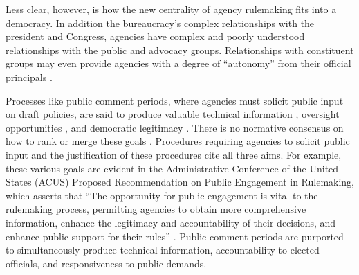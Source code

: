 Less clear, however, is how the new centrality of agency rulemaking fits into a democracy. In addition the bureaucracy's complex relationships with the president and Congress, agencies have complex and poorly understood relationships with the public and advocacy groups. Relationships with constituent groups may even provide agencies with a degree of ``autonomy'' from their official principals \citep{Carpenter2001}. %

Processes like public comment periods, where agencies must solicit public input on draft policies, are said to produce valuable technical information \citep{Yackee2006JPART, Nelson2012}, oversight opportunities \citep{Balla1998, Mccubbins1984}, and democratic legitimacy \citep{Croley2003, Rosenbloom2003}. There is no normative consensus on how to rank or merge these goals \citep{Wilson1967, Wilson1989, Carrigan2017}. Procedures requiring agencies to solicit public input and the justification of these procedures cite all three aims. For example, these various goals are evident in the Administrative Conference of the United States (ACUS) Proposed Recommendation on Public Engagement in Rulemaking, which asserts that ``The opportunity for public engagement is vital to the rulemaking process, permitting agencies to obtain more comprehensive information, enhance the legitimacy and accountability of their decisions, and enhance public support for their rules'' \citep{ACUS2018}. Public comment periods are purported to simultaneously produce technical information, accountability to elected officials, and responsiveness to public demands.

